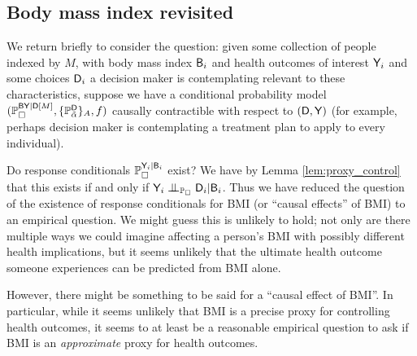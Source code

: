 \subsection{Body mass index revisited}

We return briefly to consider the question: given some collection of people indexed by $M$, with body mass index $\mathsf{B}_i$ and health outcomes of interest $\mathsf{Y}_i$ and some choices $\mathsf{D}_i$ a decision maker is contemplating relevant to these characteristics, suppose we have a conditional probability model $(\mathbb{P}_\square^{\mathsf{BY}|\mathsf{D}[M]},\{\mathbb{P}_{\tilde{\alpha}}^{\mathsf{D}}\}_A,f)$ causally contractible with respect to $(\mathsf{D},\mathsf{Y})$ (for example, perhaps decision maker is contemplating a treatment plan to apply to every individual).

Do response conditionals $\mathbb{P}_\square^{\mathsf{Y}_i|\mathsf{B}_i}$ exist? We have by Lemma \ref{lem:proxy_control} that this exists if and only if $\RV{Y}_i\CI_{\prob{P}_\square} \RV{D}_i|\RV{B}_i$. Thus we have reduced the question of the existence of response conditionals for BMI (or ``causal effects'' of BMI) to an empirical question. We might guess this is unlikely to hold; not only are there multiple ways we could imagine affecting a person's BMI with possibly different health implications, but it seems unlikely that the ultimate health outcome someone experiences can be predicted from BMI alone.

However, there might be something to be said for a ``causal effect of BMI''. In particular, while it seems unlikely that BMI is a precise proxy for controlling health outcomes, it seems to at least be a reasonable empirical question to ask if BMI is an \emph{approximate} proxy for health outcomes.